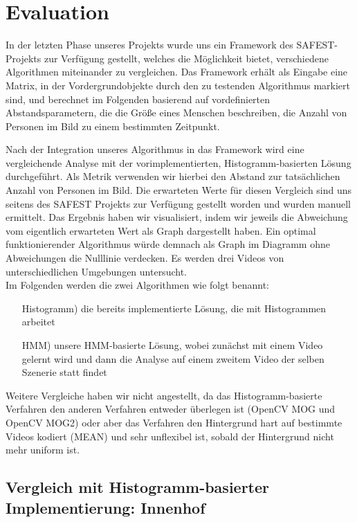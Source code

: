 \section{Evaluation}
\label{chap:evaluation}
In der letzten Phase unseres Projekts wurde uns ein Framework des SAFEST-Projekts zur Verfügung gestellt, welches die Möglichkeit bietet, verschiedene Algorithmen miteinander zu vergleichen. Das Framework erhält als Eingabe eine Matrix, in der Vordergrundobjekte durch den zu testenden  Algorithmus markiert sind, und berechnet im Folgenden basierend auf vordefinierten Abstandsparametern, die die Größe eines Menschen beschreiben, die Anzahl von Personen im Bild zu einem bestimmten Zeitpunkt.

Nach der Integration unseres Algorithmus in das Framework wird eine vergleichende Analyse mit der vorimplementierten, Histogramm-basierten Lösung durchgeführt. Als Metrik verwenden wir hierbei den Abstand zur tatsächlichen Anzahl von Personen im Bild. Die erwarteten Werte für diesen Vergleich sind uns seitens des SAFEST Projekts zur Verfügung gestellt worden und wurden manuell ermittelt. Das Ergebnis haben wir visualisiert, indem wir jeweils die Abweichung vom eigentlich erwarteten Wert als Graph dargestellt haben. Ein optimal funktionierender Algorithmus würde demnach als Graph im Diagramm ohne Abweichungen die Nulllinie verdecken. Es werden drei Videos von unterschiedlichen Umgebungen untersucht.\\
Im Folgenden werden die zwei Algorithmen wie folgt benannt:
\begin{itemize}
	\item[Histogramm)] die bereits implementierte Lösung, die mit Histogrammen arbeitet
	\item[HMM)] unsere HMM-basierte Lösung, wobei zunächst mit einem Video gelernt wird und dann die Analyse auf einem zweitem Video der selben Szenerie statt findet
\end{itemize}
Weitere Vergleiche haben wir nicht angestellt, da das Histogramm-basierte Verfahren den anderen Verfahren entweder überlegen ist (OpenCV MOG und OpenCV MOG2) oder aber das Verfahren den Hintergrund hart auf bestimmte Videos kodiert (MEAN) und sehr unflexibel ist, sobald der Hintergrund nicht mehr uniform ist.

\subsection{Vergleich mit Histogramm-basierter Implementierung: Innenhof}
\label{sec:eval_innenhof}

